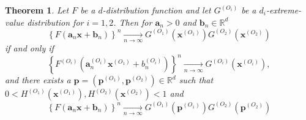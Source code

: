 \documentclass[11pt]{article}
\newtheorem{theorem}{Theorem}
\begin{document}
	\begin{theorem}
		\label{thm:ext_takahashi}
		Let $F$ be a $d$-distribution function and let $G^{(O_i)}$ be a $d_i$-extreme-value distribution for $i = 1,2$. Then for $\textbf{a}_n > 0$ and $\textbf{b}_n \in \mathbb{R}^d$
		\begin{equation}
			\label{eq:app_product}
			\left\{ F(\textbf{a}_n \textbf{x} + \textbf{b}_n) \right\}^n \underset{n \rightarrow \infty}{\longrightarrow} G^{(O_1)}(\textbf{x}^{(O_1)}) G^{(O_2)}(\textbf{x}^{(O_2)})
		\end{equation}
		if and only if
		\begin{equation}
			\label{eq:app_weak_conv}
			\left\{ F^{(O_i)} (\textbf{a}_n^{(O_i)} \textbf{x}^{(O_1)} + b_n^{(O_i)}) \right\}^{n} \underset{n \rightarrow \infty}{\longrightarrow} G^{(O_i)}(\textbf{x}^{(O_i)}),
		\end{equation}
		and there exists a $\textbf{p} = (\textbf{p}^{(O_1)}, \textbf{p}^{(O_2)}) \in \mathbb{R}^d$ such that $0 < H^{(O_1)}(\textbf{x}^{(O_1)}), H^{(O_2)}(\textbf{x}^{(O_2)}) < 1$ and
		\begin{equation}
			\label{eq:app_product_onepoint}
			\left\{ F(\textbf{a}_n \textbf{x} + \textbf{b}_n) \right\}^n \underset{n \rightarrow \infty}{\longrightarrow} G^{(O_1)}(\textbf{p}^{(O_1)}) G^{(O_2)}(\textbf{p}^{(O_2)})
		\end{equation}
	\end{theorem}
\end{document}
